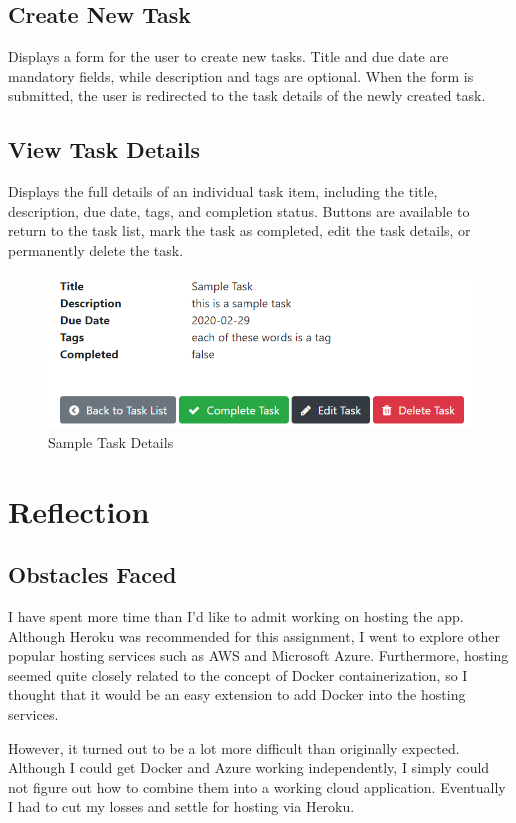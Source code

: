 \documentclass[12pt]{article}
\begin{document}
  	\subsection{Create New Task}
  	Displays a form for the user to create new tasks. Title and due date are mandatory fields, while description and tags are optional. When the form is submitted, the user is redirected to the task details of the newly created task.
  	\subsection{View Task Details}
  	Displays the full details of an individual task item, including the title, description, due date, tags, and completion status. Buttons are available to return to the task list, mark the task as completed, edit the task details, or permanently delete the task.
  	
   	\begin{figure}[h]
	  \includegraphics[width=12cm]{details.png}
	  \centering
	  \caption{Sample Task Details}
	\end{figure}
    
  \newpage
  \section{Reflection}
\setlength{\parindent}{0pt}
\setlength{\parskip}{1em}
	
	\subsection{Obstacles Faced}
	  I have spent more time than I'd like to admit working on hosting the app. Although Heroku was recommended for this assignment, I went to explore other popular hosting services such as AWS and Microsoft Azure. Furthermore, hosting seemed quite closely related to the concept of Docker containerization, so I thought that it would be an easy extension to add Docker into the hosting services.
	  
	  However, it turned out to be a lot more difficult than originally expected. Although I could get Docker and Azure working independently, I simply could not figure out how to combine them into a working cloud application. Eventually I had to cut my losses and settle for hosting via Heroku.
	
\end{document}
